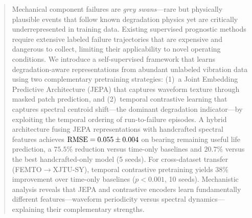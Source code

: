 \begin{abstract}
Mechanical component failures are \emph{grey swans}---rare but physically plausible events that follow known degradation physics yet are critically underrepresented in training data.
Existing supervised prognostic methods require extensive labeled failure trajectories that are expensive and dangerous to collect, limiting their applicability to novel operating conditions.
We introduce a self-supervised framework that learns degradation-aware representations from abundant unlabeled vibration data using two complementary pretraining strategies: (1)~a Joint Embedding Predictive Architecture (JEPA) that captures waveform texture through masked patch prediction, and (2)~temporal contrastive learning that captures spectral centroid shift---the dominant degradation indicator---by exploiting the temporal ordering of run-to-failure episodes.
A hybrid architecture fusing JEPA representations with handcrafted spectral features achieves $\rmse = 0.055 \pm 0.004$ on bearing remaining useful life prediction, a $75.5\%$ reduction versus time-only baselines and $20.7\%$ versus the best handcrafted-only model (5 seeds).
For cross-dataset transfer (FEMTO$\to$XJTU-SY), temporal contrastive pretraining yields $38\%$ improvement over time-only baselines ($p < 0.001$, 10 seeds).
Mechanistic analysis reveals that JEPA and contrastive encoders learn fundamentally different features---waveform periodicity versus spectral dynamics---explaining their complementary strengths.
\end{abstract}
